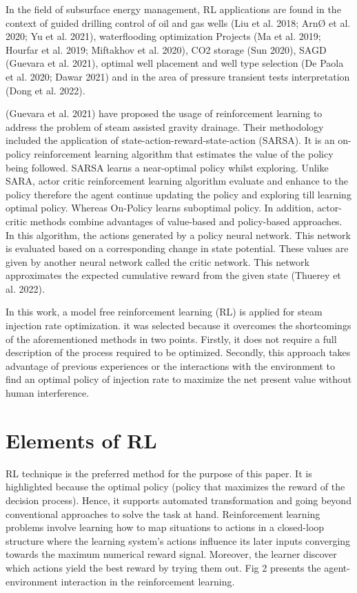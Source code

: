 In the field of subsurface energy management, RL applications are found in the context of guided drilling control of oil and gas wells (Liu et al. 2018; ArnØ et al. 2020; Yu et al. 2021), waterflooding optimization Projects (Ma et al. 2019; Hourfar et al. 2019; Miftakhov et al. 2020), CO2 storage (Sun 2020), SAGD (Guevara et al. 2021), optimal well placement and well type selection (De Paola et al. 2020; Dawar 2021) and in the area of pressure transient tests interpretation (Dong et al. 2022).

(Guevara et al. 2021) have proposed the usage of reinforcement learning to address the problem of steam assisted gravity drainage. Their methodology included the application of state-action-reward-state-action (SARSA). It is an on-policy reinforcement learning algorithm that estimates the value of the policy being followed. SARSA learns a near-optimal policy whilst exploring. Unlike SARA, actor critic reinforcement learning algorithm evaluate and enhance to the policy therefore the agent continue updating the policy and exploring till learning optimal policy. Whereas On-Policy learns suboptimal policy. In addition, actor-critic methods combine advantages of value-based and policy-based approaches. In this algorithm, the actions generated by a policy neural network. This network is evaluated based on a corresponding change in state potential. These values are given by another neural network called the critic network. This network approximates the expected cumulative reward from the given state (Thuerey et al. 2022).

In this work, a model free  reinforcement learning (RL) is applied for steam injection rate optimization. it was selected because it overcomes the shortcomings of the aforementioned methods in two points. Firstly, it does not require a full description of the process required to be optimized. Secondly, this approach takes advantage of previous experiences or the interactions with the environment to find an optimal policy of injection rate to maximize the net present value without human interference. 


\section{Elements of \ac{RL}}

\ac{RL} technique is the preferred method for the purpose of this paper. It is highlighted because the optimal policy (policy that maximizes the reward of the decision process). Hence, it supports automated transformation and going beyond conventional approaches to solve the task at hand. Reinforcement learning problems involve learning how to map situations to actions in a closed-loop structure where the learning system’s actions influence its later inputs converging towards the maximum numerical reward signal. Moreover, the learner discover which actions yield the best reward by trying them out. Fig 2 presents the agent-environment interaction in the reinforcement learning.

